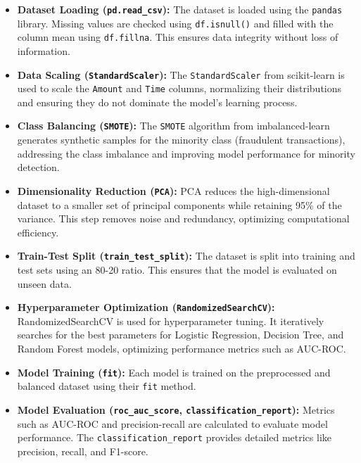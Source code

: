 \documentclass[journal]{IEEEtran}
\begin{document}
\begin{itemize}
    \item \textbf{Dataset Loading (\texttt{pd.read\_csv}):} The dataset is loaded using the \texttt{pandas} library. Missing values are checked using \texttt{df.isnull()} and filled with the column mean using \texttt{df.fillna}. This ensures data integrity without loss of information.

    \item \textbf{Data Scaling (\texttt{StandardScaler}):} The \texttt{StandardScaler} from scikit-learn is used to scale the \texttt{Amount} and \texttt{Time} columns, normalizing their distributions and ensuring they do not dominate the model's learning process.

    \item \textbf{Class Balancing (\texttt{SMOTE}):} The \texttt{SMOTE} algorithm from imbalanced-learn generates synthetic samples for the minority class (fraudulent transactions), addressing the class imbalance and improving model performance for minority detection.

    \item \textbf{Dimensionality Reduction (\texttt{PCA}):} PCA reduces the high-dimensional dataset to a smaller set of principal components while retaining 95\% of the variance. This step removes noise and redundancy, optimizing computational efficiency.

    \item \textbf{Train-Test Split (\texttt{train\_test\_split}):} The dataset is split into training and test sets using an 80-20 ratio. This ensures that the model is evaluated on unseen data.

    \item \textbf{Hyperparameter Optimization (\texttt{RandomizedSearchCV}):} RandomizedSearchCV is used for hyperparameter tuning. It iteratively searches for the best parameters for Logistic Regression, Decision Tree, and Random Forest models, optimizing performance metrics such as AUC-ROC.

    \item \textbf{Model Training (\texttt{fit}):} Each model is trained on the preprocessed and balanced dataset using their \texttt{fit} method.

    \item \textbf{Model Evaluation (\texttt{roc\_auc\_score}, \texttt{classification\_report}):} Metrics such as AUC-ROC and precision-recall are calculated to evaluate model performance. The \texttt{classification\_report} provides detailed metrics like precision, recall, and F1-score.


\end{itemize}
\end{document}
